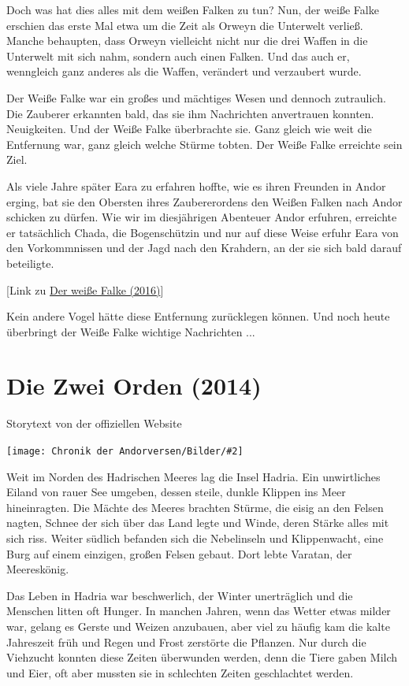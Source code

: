 \documentclass[10pt, a4paper, oneside]{book}
\newcommand{\fillbreak}{\vspace*{\fill}\columnbreak}
\newcommand{\storytext}[1]{%
    \section{#1}%
    \label{Storytext: #1}%
}
\newcommand{\refstorytext}[1]{\hyperref[Storytext: #1]{#1}}
\newcommand{\bildmitts}[2][height=0.32\textwidth,width=0.48\textwidth,keepaspectratio]{%
    \begin{center}
        \texttt{[image: Chronik der Andorversen/Bilder/\#2]}
    \end{center}
}
\begin{document}
\begin{multicols}{2}
Doch was hat dies alles mit dem weißen Falken zu tun? Nun, der weiße Falke erschien das erste Mal etwa um die Zeit als Orweyn die Unterwelt verließ. Manche behaupten, dass Orweyn vielleicht nicht nur die drei Waffen in die Unterwelt mit sich nahm, sondern auch einen Falken. Und das auch er, wenngleich ganz anderes als die Waffen, verändert und verzaubert wurde.\bigskip

Der Weiße Falke war ein großes und mächtiges Wesen und dennoch zutraulich. Die Zauberer erkannten bald, das sie ihm Nachrichten anvertrauen konnten. Neuigkeiten. Und der Weiße Falke überbrachte sie. Ganz gleich wie weit die Entfernung war, ganz gleich welche Stürme tobten. Der Weiße Falke erreichte sein Ziel.

Als viele Jahre später Eara zu erfahren hoffte, wie es ihren Freunden in Andor erging, bat sie den Obersten ihres Zaubererordens den Weißen Falken nach Andor schicken zu dürfen. Wie wir im diesjährigen Abenteuer Andor erfuhren, erreichte er tatsächlich Chada, die Bogenschützin und nur auf diese Weise erfuhr Eara von den Vorkommnissen und der Jagd nach den Krahdern, an der sie sich bald darauf beteiligte.

[Link zu \refstorytext{Der weiße Falke (2016)}]\bigskip

Kein andere Vogel hätte diese Entfernung zurücklegen können. Und noch heute überbringt der Weiße Falke wichtige Nachrichten ...



\fillbreak
\storytext{Die Zwei Orden (2014)}

\begin{center}
    Storytext von der offiziellen Website
\end{center}

\bildmitts{AoH Ank 1.jpeg}

Weit im Norden des Hadrischen Meeres lag die Insel Hadria. Ein unwirtliches Eiland von rauer See umgeben, dessen steile, dunkle Klippen ins Meer hineinragten. Die Mächte des Meeres brachten Stürme, die eisig an den Felsen nagten, Schnee der sich über das Land legte und Winde, deren Stärke alles mit sich riss. Weiter südlich befanden sich die Nebelinseln und Klippenwacht, eine Burg auf einem einzigen, großen Felsen gebaut. Dort lebte Varatan, der Meereskönig.\bigskip

Das Leben in Hadria war beschwerlich, der Winter unerträglich und die Menschen litten oft Hunger. In manchen Jahren, wenn das Wetter etwas milder war, gelang es Gerste und Weizen anzubauen, aber viel zu häufig kam die kalte Jahreszeit früh und Regen und Frost zerstörte die Pflanzen. Nur durch die Viehzucht konnten diese Zeiten überwunden werden, denn die Tiere gaben Milch und Eier, oft aber mussten sie in schlechten Zeiten geschlachtet werden.\bigskip


\end{multicols}
\end{document}
